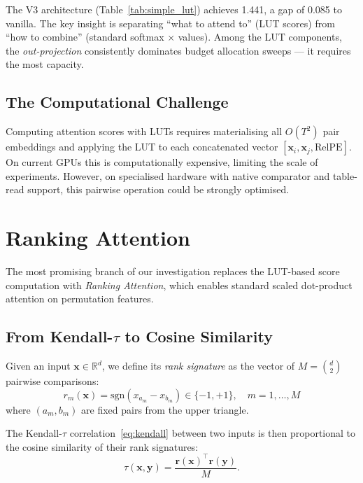 \documentclass[11pt]{article}
\begin{document}
The V3 architecture (Table~\ref{tab:simple_lut}) achieves 1.441, a gap of 0.085 to vanilla.
The key insight is separating ``what to attend to'' (LUT scores) from ``how to combine'' (standard softmax $\times$ values).
Among the LUT components, the \emph{out-projection} consistently dominates budget allocation sweeps --- it requires the most capacity.

\subsection{The Computational Challenge}

Computing attention scores with LUTs requires materialising all $O(T^2)$ pair embeddings and applying the LUT to each concatenated vector $[\mathbf{x}_i, \mathbf{x}_j, \mathrm{RelPE}]$.
On current GPUs this is computationally expensive, limiting the scale of experiments.
However, on specialised hardware with native comparator and table-read support, this pairwise operation could be strongly optimised.


\section{Ranking Attention}
\label{sec:rank_attn}

The most promising branch of our investigation replaces the LUT-based score computation with \emph{Ranking Attention}, which enables standard scaled dot-product attention on permutation features.

\subsection{From Kendall-\texorpdfstring{$\tau$}{tau} to Cosine Similarity}

Given an input $\mathbf{x} \in \mathbb{R}^d$, we define its \emph{rank signature} as the vector of $M = \binom{d}{2}$ pairwise comparisons:
\begin{equation}
    r_m(\mathbf{x}) = \mathrm{sgn}(x_{a_m} - x_{b_m}) \in \{-1, +1\}, \quad m = 1, \ldots, M
    \label{eq:rank_sig}
\end{equation}
where $(a_m, b_m)$ are fixed pairs from the upper triangle.

The Kendall-$\tau$ correlation~\eqref{eq:kendall} between two inputs is then proportional to the cosine similarity of their rank signatures:
\begin{equation}
    \tau(\mathbf{x}, \mathbf{y}) = \frac{\mathbf{r}(\mathbf{x})^\top \mathbf{r}(\mathbf{y})}{M}.
    \label{eq:tau_cosine}
\end{equation}
\end{document}
